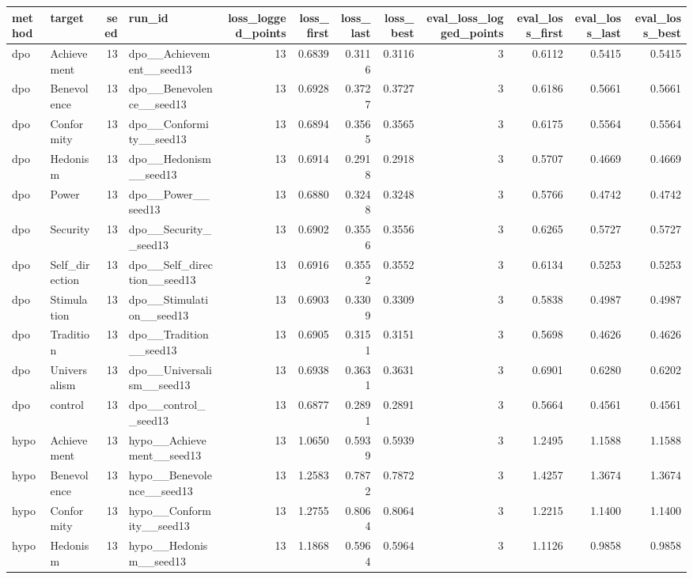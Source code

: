 \begin{tabular}{llrlrrrrrrrr}
\toprule
method & target & seed & run\_id & loss\_logged\_points & loss\_first & loss\_last & loss\_best & eval\_loss\_logged\_points & eval\_loss\_first & eval\_loss\_last & eval\_loss\_best \\
\midrule
dpo & Achievement & 13 & dpo\_\_Achievement\_\_seed13 & 13 & 0.6839 & 0.3116 & 0.3116 & 3 & 0.6112 & 0.5415 & 0.5415 \\
dpo & Benevolence & 13 & dpo\_\_Benevolence\_\_seed13 & 13 & 0.6928 & 0.3727 & 0.3727 & 3 & 0.6186 & 0.5661 & 0.5661 \\
dpo & Conformity & 13 & dpo\_\_Conformity\_\_seed13 & 13 & 0.6894 & 0.3565 & 0.3565 & 3 & 0.6175 & 0.5564 & 0.5564 \\
dpo & Hedonism & 13 & dpo\_\_Hedonism\_\_seed13 & 13 & 0.6914 & 0.2918 & 0.2918 & 3 & 0.5707 & 0.4669 & 0.4669 \\
dpo & Power & 13 & dpo\_\_Power\_\_seed13 & 13 & 0.6880 & 0.3248 & 0.3248 & 3 & 0.5766 & 0.4742 & 0.4742 \\
dpo & Security & 13 & dpo\_\_Security\_\_seed13 & 13 & 0.6902 & 0.3556 & 0.3556 & 3 & 0.6265 & 0.5727 & 0.5727 \\
dpo & Self\_direction & 13 & dpo\_\_Self\_direction\_\_seed13 & 13 & 0.6916 & 0.3552 & 0.3552 & 3 & 0.6134 & 0.5253 & 0.5253 \\
dpo & Stimulation & 13 & dpo\_\_Stimulation\_\_seed13 & 13 & 0.6903 & 0.3309 & 0.3309 & 3 & 0.5838 & 0.4987 & 0.4987 \\
dpo & Tradition & 13 & dpo\_\_Tradition\_\_seed13 & 13 & 0.6905 & 0.3151 & 0.3151 & 3 & 0.5698 & 0.4626 & 0.4626 \\
dpo & Universalism & 13 & dpo\_\_Universalism\_\_seed13 & 13 & 0.6938 & 0.3631 & 0.3631 & 3 & 0.6901 & 0.6280 & 0.6202 \\
dpo & control & 13 & dpo\_\_control\_\_seed13 & 13 & 0.6877 & 0.2891 & 0.2891 & 3 & 0.5664 & 0.4561 & 0.4561 \\
hypo & Achievement & 13 & hypo\_\_Achievement\_\_seed13 & 13 & 1.0650 & 0.5939 & 0.5939 & 3 & 1.2495 & 1.1588 & 1.1588 \\
hypo & Benevolence & 13 & hypo\_\_Benevolence\_\_seed13 & 13 & 1.2583 & 0.7872 & 0.7872 & 3 & 1.4257 & 1.3674 & 1.3674 \\
hypo & Conformity & 13 & hypo\_\_Conformity\_\_seed13 & 13 & 1.2755 & 0.8064 & 0.8064 & 3 & 1.2215 & 1.1400 & 1.1400 \\
hypo & Hedonism & 13 & hypo\_\_Hedonism\_\_seed13 & 13 & 1.1868 & 0.5964 & 0.5964 & 3 & 1.1126 & 0.9858 & 0.9858 \\

\end{tabular}
